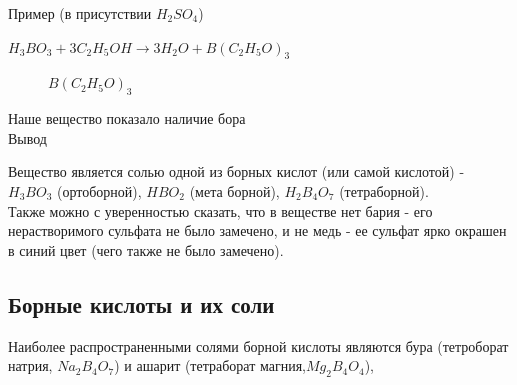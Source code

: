 \documentclass[a4paper,14pt,titlepage,twoside]{article}
\begin{document}
            Пример (в присутствии $H_2SO_4$)
            
            \par $H_3BO_3  + 3C_2H_5OH \to 3H_2O + B(C_2H_5O)_3$\\
            
            \begin{figure}[h]
                \caption{$B(C_2H_5O)_3$}
            \end{figure}

            Наше вещество показало наличие бора\\

            Вывод

            Вещество является солью одной из борных кислот (или самой кислотой) -
            $H_3BO_3$ (ортоборной), $HBO_2$ (мета борной), $H_2B_4O_7$ (тетраборной).\\

            Также можно с уверенностью сказать, что в веществе нет бария - его нерастворимого сульфата
            не было замечено, и не медь - ее сульфат ярко окрашен в синий цвет (чего также не было замечено).

        \subsection{Борные кислоты  и их соли}
            Наиболее распространенными солями борной кислоты являются бура (тетроборат натрия, $Na_2B_4O_7$) и ашарит
            (тетраборат магния,$Mg_2B_4O_4$),\\
\end{document}
